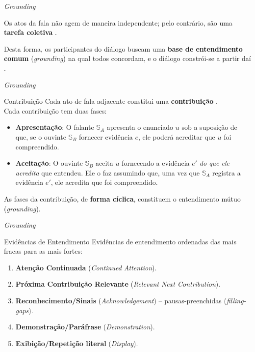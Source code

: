 \begin{frame}{\textit{Grounding}}
  \begin{block}{}
    Os atos da fala não agem de maneira independente; pelo contrário, são uma
    \textbf{tarefa coletiva} \cite{lang_processing_book}.
  \end{block}
  \begin{block}{}
    Desta forma, os participantes do diálogo buscam uma \textbf{base de entendimento
    comum} (\textit{grounding}) na qual todos concordam, e o diálogo constrói-se a partir
    daí \cite{lang_processing_book}.
  \end{block}
\end{frame}

\begin{frame}{\textit{Grounding}}
  \begin{block}{Contribuição}
    Cada ato de fala adjacente constitui uma \textbf{contribuição}
    \cite{contributing_to_discourse_1989}. \\
    Cada contribuição tem duas fases:
    \begin{itemize}
      \item \textbf{Apresentação}: O falante \(\mathbb{S}_A\) apresenta o enunciado \(u\)
        sob a suposição de que, se o ouvinte \(\mathbb{S}_B\) fornecer evidência \(e\),
        ele poderá acreditar que \(u\) foi compreendido.
      \item \textbf{Aceitação}: O ouvinte \(\mathbb{S}_B\) aceita \(u\) fornecendo a
        evidência \(e'\) \textit{do que ele acredita} que entendeu. Ele o faz assumindo
        que, uma vez que  \(\mathbb{S}_A\) registra a evidência \(e'\), ele acredita que
        foi compreendido.
    \end{itemize}
    \pause
    As fases da contribuição, de \textbf{forma cíclica}, constituem o entendimento mútuo
    (\textit{grounding}).
  \end{block}
\end{frame}

\begin{frame}{\textit{Grounding}}
  \begin{block}{Evidências de Entendimento}
    Evidências de entendimento\cite{contributing_to_discourse_1989} ordenadas das mais
    fracas para as mais fortes:
    \begin{enumerate}
      \item \textbf{Atenção Continuada} (\textit{Continued Attention}).
      \item \textbf{Próxima Contribuição Relevante} (\textit{Relevant Next Contribution}).
      \item \textbf{Reconhecimento/Sinais} (\textit{Acknowledgement}) --
        pausas-preenchidas (\textit{filling-gaps}).
      \item \textbf{Demonstração/Paráfrase} (\textit{Demonstration}).
      \item \textbf{Exibição/Repetição literal} (\textit{Display}).
    \end{enumerate}
  \end{block}
\end{frame}

